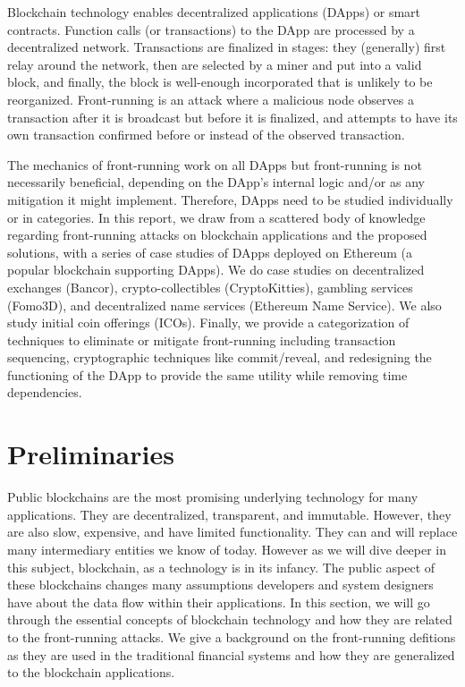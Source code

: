 Blockchain technology enables decentralized applications (DApps) or smart contracts. Function calls (or transactions) to the DApp are processed by a decentralized network. Transactions are finalized in stages: they (generally) first relay around the network, then are selected by a miner and put into a valid block, and finally, the block is well-enough incorporated that is unlikely to be reorganized. Front-running is an attack where a malicious node observes a transaction after it is broadcast but before it is finalized, and attempts to have its own transaction confirmed before or instead of the observed transaction.

The mechanics of front-running work on all DApps but front-running is not necessarily beneficial, depending on the DApp's internal logic and/or as any mitigation it might implement. Therefore, DApps need to be studied individually or in categories. In this report, we draw from a scattered body of knowledge regarding front-running attacks on blockchain applications and the proposed solutions, with a series of case studies of DApps deployed on Ethereum (a popular blockchain supporting DApps). We do case studies on decentralized exchanges (\eg Bancor), crypto-collectibles (\eg CryptoKitties), gambling services (\eg Fomo3D), and decentralized name services (\eg Ethereum Name Service). We also study initial coin offerings (ICOs). Finally, we provide a categorization of techniques to eliminate or mitigate front-running including transaction sequencing, cryptographic techniques like commit/reveal, and redesigning the functioning of the DApp to provide the same utility while removing time dependencies.




\section{Preliminaries}
Public blockchains are the most promising underlying technology for many applications. They are decentralized, transparent, and immutable. However, they are also slow, expensive, and have limited functionality. They can and will replace many intermediary entities we know of today. However as we will dive deeper in this subject, blockchain, as a technology is in its infancy. The public aspect of these blockchains changes many assumptions developers and system designers have about the data flow within their applications. In this section, we will go through the essential concepts of blockchain technology and how they are related to the front-running attacks. We give a background on the front-running defitions as they are used in the traditional financial systems and how they are generalized to the blockchain applications. 


